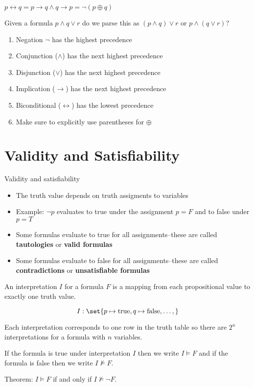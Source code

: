 \documentclass{scrreprt}
\newcommand{\true}{\text{true}}
\newcommand{\false}{\text{false}}
\begin{document}
\begin{definition}[Biconditionals]
	$p\leftrightarrow q = p\rightarrow q \land q\rightarrow p = \neg (p\oplus q)$
\end{definition}

\begin{example}
	Given a formula $p\land q \lor r$ do we parse this as $(p\land q)\lor r$ or $p\land (q\lor r)$?

	\begin{enumerate}
		\item Negation $\neg$ has the highest precedence
		\item Conjunction ($\land$) has the next highest precedence
		\item Disjunction ($\lor$) has the next highest precedence
		\item Implication ($\rightarrow$) has the next highest precedence
		\item Biconditional ($\leftrightarrow$) has the lowest precedence
		\item Make sure to explicitly use parentheses for $\oplus$
	\end{enumerate}
\end{example}

\section{Validity and Satisfiability}

Validity and satisfiability
\begin{itemize}
	\item The truth value depends on truth assigments to variables
	\item Example: $\neg p$ evaluates to true under the assignment $p=F$ and to false under $p=T$
	\item Some formulas evaluate to true for all assignments--these are called \textbf{tautologies} or \textbf{valid formulas}
	\item Some formulas evaluate to false for all assignments--these are called \textbf{contradictions} or \textbf{unsatisfiable formulas}
\end{itemize}

\begin{definition}[Interpretation]
	An interpretation $I$ for a formula $F$ is a mapping from each propositional
	value to exactly one truth value.

	\[
		I: \set{p\mapsto \true, q\mapsto \false, \ldots,}
	\]

	Each interpretation corresponds to one row in the truth table so there are $2^n$ interpretations for a formula with $n$ variables.

	If the formula is true under interpretation $I$ then we write $I\models F$ and if the formula is false then we write $I\not\models F$.

	Theorem: $I\models F$ if and only if $I\not\models \neg F$.
\end{definition}
\end{document}
